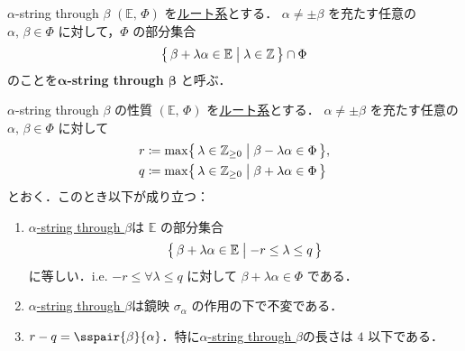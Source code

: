 \documentclass[rep_main]{subfiles}
\begin{document}
\begin{mydef}[label=def:a-sting]{$\alpha$-string through $\beta$}
	$(\mathbb{E},\, \Phi)$ を\hyperref[ax:root-system]{ルート系}とする．
	$\alpha \neq \pm \beta$ を充たす任意の $\alpha,\, \beta \in \Phi$ に対して，$\Phi$ の部分集合
	\begin{align}
		\bigl\{\, \beta + \lambda \alpha \in \mathbb{E} \bigm| \lambda \in \mathbb{Z} \,\bigr\} \cap \Phi
	\end{align}
	のことを\textbf{$\bm{\alpha}$-string through $\bm{\beta}$} と呼ぶ．
\end{mydef}

\begin{myprop}[label=prop:a-string-basic]{$\alpha$-string through $\beta$ の性質}
	$(\mathbb{E},\, \Phi)$ を\hyperref[ax:root-system]{ルート系}とする．
	$\alpha \neq \pm \beta$ を充たす任意の $\alpha,\, \beta \in \Phi$ に対して
	\begin{align}
		r &\coloneqq \max \bigl\{\, \lambda \in \mathbb{Z}_{\ge 0} \bigm| \beta - \lambda \alpha \in \Phi \,\bigr\}, \\
		q &\coloneqq \max \bigl\{\, \lambda \in \mathbb{Z}_{\ge 0} \bigm| \beta + \lambda \alpha \in \Phi \,\bigr\} 
	\end{align}
	とおく．このとき以下が成り立つ：
	\begin{enumerate}
		\item 
		\hyperref[def:a-sting]{$\alpha$-string through $\beta$}は $\mathbb{E}$ の部分集合
		\begin{align}
			\label{eq:a-string}
			\bigl\{\, \beta + \lambda\alpha \in \mathbb{E} \bigm| -r \le \lambda \le q \,\bigr\} 
		\end{align}
		に等しい．i.e. $-r \le \forall \lambda \le q$ に対して $\beta + \lambda\alpha \in \Phi$ である．
		\item \hyperref[def:a-sting]{$\alpha$-string through $\beta$}は鏡映 $\sigma_\alpha$ の作用の下で不変である．
		\item $r-q = \sspair{\beta}{\alpha}$．特に\hyperref[def:a-sting]{$\alpha$-string through $\beta$}の長さは $4$ 以下である．
	\end{enumerate}
\end{myprop}
\end{document}
